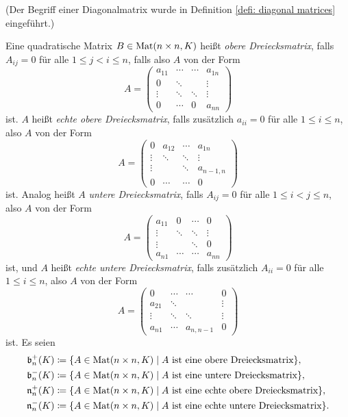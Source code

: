 (Der Begriff einer Diagonalmatrix wurde in Definition \ref{defi: diagonal matrices} eingeführt.)

\begin{defi}
 Eine quadratische Matrix $B \in \mathrm{Mat}(n \times n, K)$ heißt \emph{obere Dreiecksmatrix}, falls $A_{ij} = 0$ für alle $1 \leq j < i \leq n$, falls also $A$ von der Form
 \[
  A =
  \begin{pmatrix}
   a_{11} & \cdots & \cdots & a_{1n} \\
   0      & \ddots &        & \vdots \\
   \vdots & \ddots & \ddots & \vdots \\
   0      & \cdots & 0      & a_{nn}
  \end{pmatrix}
 \]
 ist. $A$ heißt \emph{echte obere Dreiecksmatrix}, falls zusätzlich $a_{ii} = 0$ für alle $1 \leq i \leq n$, also $A$ von der Form
 \[
  A =
  \begin{pmatrix}
   0      & a_{12} & \cdots & a_{1n}    \\
   \vdots & \ddots & \ddots & \vdots    \\
   \vdots &        & \ddots & a_{n-1,n} \\
   0      & \cdots & \cdots & 0
  \end{pmatrix}
 \]
 ist. Analog heißt $A$ \emph{untere Dreiecksmatrix}, falls $A_{ij} = 0$ für alle $1 \leq i < j \leq n$, also $A$ von der Form
 \[
  A = 
  \begin{pmatrix}
   a_{11} & 0      & \cdots & 0      \\
   \vdots & \ddots & \ddots & \vdots \\
   \vdots &        & \ddots & 0      \\
   a_{n1} & \cdots & \cdots & a_{nn}
  \end{pmatrix}
 \]
 ist, und $A$ heißt \emph{echte untere Dreiecksmatrix}, falls zusätzlich $A_{ii} = 0$ für alle $1 \leq i \leq n$, also $A$ von der Form
 \[
  A =
  \begin{pmatrix}
   0      & \cdots & \cdots    & 0      \\
   a_{21} & \ddots &           & \vdots \\
   \vdots & \ddots & \ddots    & \vdots \\
   a_{n1} & \cdots & a_{n,n-1} & 0
  \end{pmatrix}
 \]
 ist. Es seien
 \begin{align*}
  \mathfrak{b}^+_n(K) &\coloneqq \{A \in \mathrm{Mat}(n \times n, K) \mid \text{$A$ ist eine obere Dreiecksmatrix}\}, \\
  \mathfrak{b}^-_n(K) &\coloneqq \{A \in \mathrm{Mat}(n \times n, K) \mid \text{$A$ ist eine untere Dreiecksmatrix}\}, \\
  \mathfrak{n}^+_n(K) &\coloneqq \{A \in \mathrm{Mat}(n \times n, K) \mid \text{$A$ ist eine echte obere Dreiecksmatrix}\}, \\
  \mathfrak{n}^-_n(K) &\coloneqq \{A \in \mathrm{Mat}(n \times n, K) \mid \text{$A$ ist eine echte untere Dreiecksmatrix}\}.
 \end{align*}
\end{defi}

